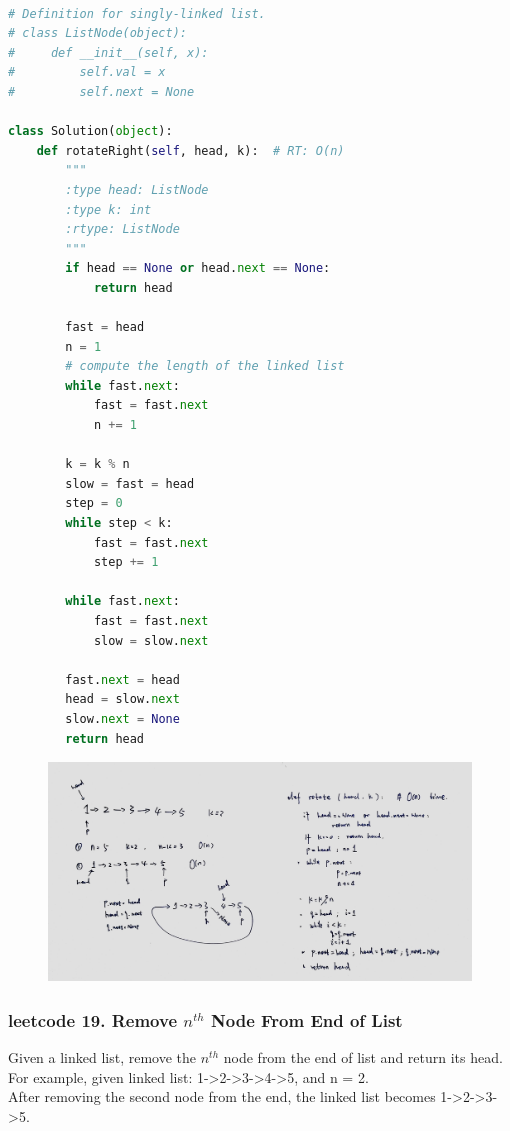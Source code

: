 \documentclass[a4paper,10pt]{article}
\begin{document}
\begin{lstlisting}[language=Python, caption=Problem61. Rotate List]

# Definition for singly-linked list.
# class ListNode(object):
#     def __init__(self, x):
#         self.val = x
#         self.next = None

class Solution(object):
    def rotateRight(self, head, k):  # RT: O(n)
        """
        :type head: ListNode
        :type k: int
        :rtype: ListNode
        """
        if head == None or head.next == None:
            return head

        fast = head
        n = 1
        # compute the length of the linked list
        while fast.next:
            fast = fast.next
            n += 1

        k = k % n
        slow = fast = head
        step = 0
        while step < k:
            fast = fast.next
            step += 1

        while fast.next:
            fast = fast.next
            slow = slow.next

        fast.next = head
        head = slow.next
        slow.next = None
        return head
\end{lstlisting}

\begin{figure}[h]
    \includegraphics[width=\textwidth]{leetcode61.jpg}
    \centering \\
\end{figure}




\subsubsection{leetcode 19. Remove $n^{th}$ Node From End of List}
Given a linked list, remove the $n^{th}$ node from the end of list and return its head. For example, given linked list: 1->2->3->4->5, and n = 2. \\
\indent After removing the second node from the end, the linked list becomes 1->2->3->5. \\
\end{document}
